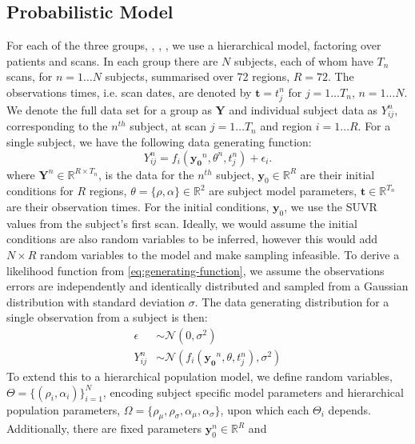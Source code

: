 \subsection{Probabilistic Model}
For each of the three groups, \ABN, \ABP \TPN, \ABP \TPP, we use a hierarchical
model, factoring over patients and scans. In each group there are $N$ subjects,
each of whom have $T_n$ scans, for $n = 1 \hdots N$ subjects, summarised
over 72 regions, $R = 72$. The observations times, i.e. scan dates, are denoted
by $\mathbf{t} = t^{n}_j$ for $j = 1 \hdots T_n$, $n = 1 \hdots N$. We denote
the full data set for a group as $\mathbf{Y}$ and individual subject data as
$Y^{n}_{ij}$, corresponding to the $n^{th}$ subject, at scan $j = 1 \hdots T_n$
and region $i = 1 \hdots R$. For a single subject, we have the following data 
generating function:
\begin{equation}
    \label{eq:generating-function}
    Y^{n}_{ij} = 
    f_i(\mathbf{y_0}^n, \theta^n, t^n_j) + \epsilon_i.
\end{equation}
where $\mathbf{Y}^{n} \in \mathbb{R}^{R \times T_{n}}$, is the data for the
$n^{th}$ subject, $ \mathbf{y}_0 \in \mathbb{R}^{R}$ are their initial
conditions for $R$ regions, $\theta = \{\rho, \alpha\} \in \mathbb{R}^2$ are
subject model parameters, $\mathbf{t} \in \mathbb{R}^{T_{n}}$ are their
observation times. For the initial conditions, $\mathbf{y}_0$, we use the SUVR
values from the subject's first scan. Ideally, we would assume the initial
conditions are also random variables to be inferred, however this would add $N
\times R$ random variables to the model and make sampling infeasible. To derive
a likelihood function from \cref{eq:generating-function}, we assume the
observations errors are independently and identically distributed and sampled
from a Gaussian distribution with standard deviation $\sigma$. The data
generating distribution for a single observation from a subject is then:
\begin{align}
    \epsilon &\sim \mathcal{N}(0, \sigma^2) \\ 
    Y^{n}_{ij} &\sim \mathcal{N}(f_i(\mathbf{y_0}^n, \theta, t^n_j), \sigma^2)
\end{align}
To extend this to a hierarchical population model, we define random variables,
$\Theta = \{(\rho_i, \alpha_i)\}_{i=1}^{N}$, encoding subject specific model
parameters and hierarchical population parameters, $\Omega = \{ \rho_\mu ,
\rho_\sigma, \alpha_\mu, \alpha_\sigma \}$, upon which each $\Theta_i$ depends.
Additionally, there are fixed parameters $\mathbf{y}_0^n \in \mathbb{R}^{R}$ and
